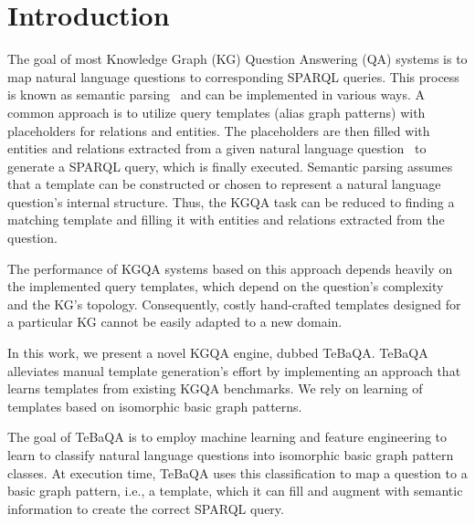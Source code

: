 \documentclass{IOS-Book-Article}
\begin{document}
\section{Introduction}
The goal of most Knowledge Graph (KG) Question Answering (QA) systems is to map natural language questions to corresponding SPARQL queries. 
This process is known as semantic parsing~\cite{berant2013semantic} and can be implemented in various ways. 
A common approach is to utilize query templates (alias graph patterns) with placeholders for relations and entities. 
The placeholders are then filled with entities and relations extracted from a given natural language question~\cite{DBLP:conf/www/AbujabalRYW18,DBLP:journals/semweb/HoffnerWMULN17,TBSL} to generate a SPARQL query, which is finally executed.  
Semantic parsing assumes that a template can be constructed or chosen to represent a natural language question's internal structure.
Thus, the KGQA task can be reduced to finding a matching template and filling it with entities and relations extracted from the question.

The performance of KGQA systems based on this approach depends heavily on the implemented query templates, which depend on the question's complexity and the KG's topology.
Consequently, costly hand-crafted templates designed for a particular KG cannot be easily adapted to a new domain. 

In this work, we present a novel KGQA engine, dubbed TeBaQA.
TeBaQA alleviates manual template generation's effort by implementing an approach that learns templates from existing KGQA benchmarks. We rely on learning of templates based on isomorphic basic graph patterns. 

The goal of TeBaQA is to employ machine learning and feature engineering to learn to classify natural language questions into isomorphic basic graph pattern classes.
At execution time, TeBaQA uses this classification to map a question to a basic graph pattern, i.e., a template, which it can fill and augment with semantic information to create the correct SPARQL query.
\end{document}
